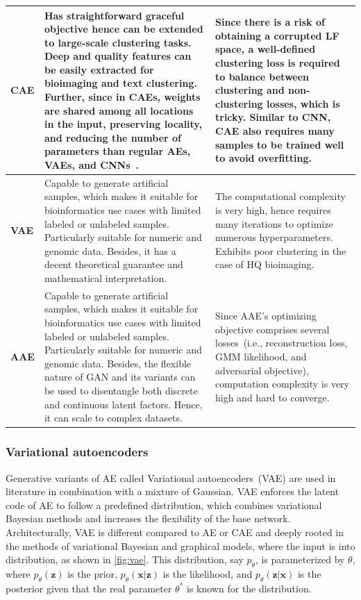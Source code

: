 \begin{table}
\begin{tabular}{p{3.5cm}|p{10.3cm}|p{10cm}}
    \textbf{CAE} & Has straightforward graceful objective hence can be extended to large-scale clustering tasks. Deep and quality features can be easily extracted for bioimaging and text clustering. Further, since in CAEs, weights are shared among all locations in the input, preserving locality, and reducing the number of parameters than regular AEs, VAEs, and CNNs~\cite{lintas2017artificial}. & Since there is a risk of obtaining a corrupted LF space, a well-defined clustering loss is required to balance between clustering and non-clustering losses, which is tricky. Similar to CNN, CAE also requires many samples to be trained well to avoid overfitting.\\\hline
    \textbf{VAE} & Capable to generate artificial samples, which makes it suitable for bioinformatics use cases with limited labeled or unlabeled samples. Particularly suitable for numeric and genomic data. Besides, it has a decent theoretical guarantee and mathematical interpretation. & The computational complexity is very high, hence requires many iterations to optimize numerous hyperparameters. Exhibits poor clustering in the case of HQ bioimaging. \\\hline
    \textbf{AAE} & Capable to generate artificial samples, which makes it suitable for bioinformatics use cases with limited labeled or unlabeled samples. Particularly suitable for numeric and genomic data. Besides, the flexible nature of GAN and its variants can be used to disentangle both discrete and continuous latent factors. Hence, it can scale to complex datasets. & Since AAE's optimizing objective comprises several losses~(i.e., reconstruction loss, GMM likelihood, and adversarial objective), computation complexity is very high and hard to converge. \\\hline
   \end{tabular}
\end{table}

\subsubsection{Variational autoencoders} 
Generative variants of AE called Variational autoencoders~(VAE) are used in literature in combination with a mixture of Gaussian. VAE enforces the latent code of AE to follow a predefined distribution, which combines variational Bayesian methods and increases the flexibility of the base network. Architecturally, VAE is different compared to AE or CAE and deeply rooted in the methods of variational Bayesian and graphical models, where the input is into distribution, as shown in \cref{fig:vae}. This distribution, say $p_{\theta}$, is parameterized by $\theta$, where $p_{\theta}(\mathbf{z})$ is the prior, $p_{\theta}(\mathbf{x} | \mathbf{z})$ is the likelihood, and $p_{\theta}(\mathbf{z}|\mathbf{x})$ is the posterior given that the real parameter $\theta^*$ is known for the distribution. 

